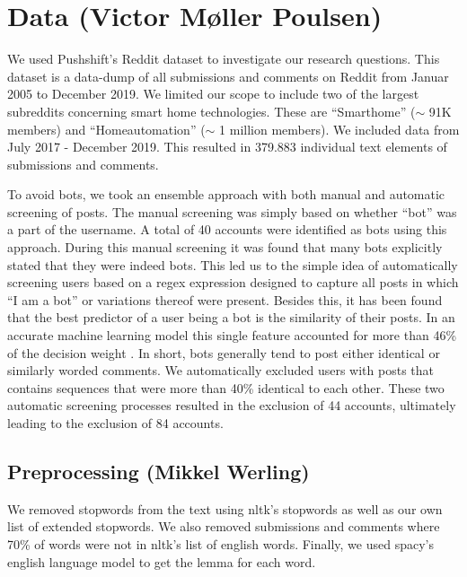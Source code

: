 \documentclass{article}
\begin{document}
    \section{Data (Victor Møller Poulsen)}
    We used Pushshift’s Reddit dataset \cite{baumgartner2020pushshift} to investigate our research questions. This dataset is a data-dump of all submissions and comments on Reddit from Januar 2005 to December 2019. We limited our scope to include two of the largest subreddits concerning smart home technologies. These are “Smarthome” ($\sim$ 91K members) and “Homeautomation” ($\sim$ 1 million members). We included data from July 2017 - December 2019. This resulted in 379.883 individual text elements of submissions and comments. 

To avoid bots, we took an ensemble approach with both manual and automatic screening of posts. The manual screening was simply based on whether “bot” was a part of the username. A total of 40 accounts were identified as bots using this approach. During this manual screening it was found that many bots explicitly stated that they were indeed bots. This led us to the simple idea of automatically screening users based on a regex expression designed to capture all posts in which “I am a bot” or variations thereof were present. Besides this, it has been found \cite{skowronski_identifying_2019} that the best predictor of a user being a bot is the similarity of their posts. In an accurate machine learning model this single feature accounted for more than 46\% of the decision weight \cite{skowronski_identifying_2019}. In short, bots generally tend to post either identical or similarly worded comments. We automatically excluded users with posts that contains sequences that were more than 40\% identical to each other. These two automatic screening processes resulted in the exclusion of 44 accounts, ultimately leading to the exclusion of 84 accounts. 

    \subsection{Preprocessing (Mikkel Werling)}
    We removed stopwords from the text using nltk’s \cite{loper2002nltk} stopwords as well as our own list of extended stopwords. We also removed submissions and comments where 70\% of words were not in nltk’s list of english words. Finally, we used spacy’s \cite{spacy2} english language model to get the lemma for each word. 
\end{document}
